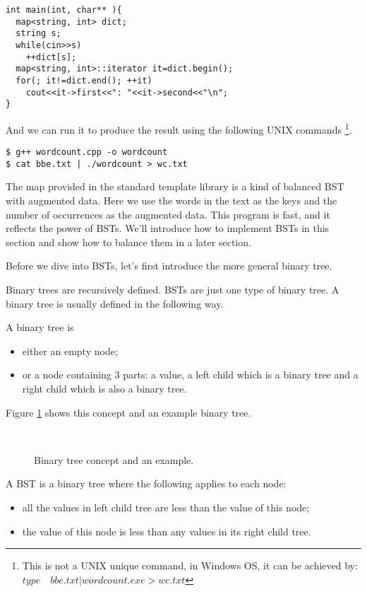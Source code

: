 \documentclass[UTF8]{article}
\begin{document}
\lstset{language=C++}
\begin{lstlisting}
int main(int, char** ){
  map<string, int> dict;
  string s;
  while(cin>>s)
    ++dict[s];
  map<string, int>::iterator it=dict.begin();
  for(; it!=dict.end(); ++it)
    cout<<it->first<<": "<<it->second<<"\n";
}
\end{lstlisting}

And we can run it to produce the result using the following UNIX commands
\footnote{This is not a UNIX unique command, in Windows OS, it can be achieved
by: $type \quad bbe.txt | wordcount.exe > wc.txt$}.

\begin{verbatim}
$ g++ wordcount.cpp -o wordcount
$ cat bbe.txt | ./wordcount > wc.txt
\end{verbatim}

The map provided in the standard template library is a kind of balanced BST
with augmented data. Here we use the words in the text as the keys and the number of
occurrences as the augmented data. This program is fast, and it reflects the power of
BSTs. We'll introduce how to implement BSTs in this section and show how
to balance them in a later section.

Before we dive into BSTs, let's first introduce the more general binary tree.

Binary trees are recursively defined. BSTs are just one
type of binary tree. A binary tree is usually defined in the following way.

A binary tree is
\begin{itemize}
\item either an empty node;
\item or a node containing 3 parts: a value, a left child which is a binary tree and a
right child which is also a binary tree.
\end{itemize}

Figure \ref{fig:binary-tree-example} shows this concept and an example binary tree.

\begin{figure}[htbp]
  \centering
   \\
  \caption{Binary tree concept and an example.}
  \label{fig:binary-tree-example}
\end{figure}

A BST is a binary tree where the following applies to each node:
\begin{itemize}
\item all the values in left child tree are less than the value of this node;
\item the value of this node is less than any values in its right child tree.
\end{itemize}
\end{document}
